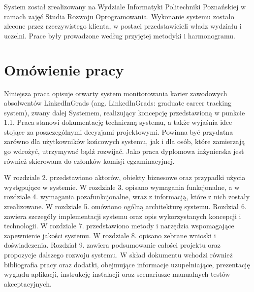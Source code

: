 System został zrealizowany na Wydziale Informatyki Politechniki Poznańskiej w ramach zajęć Studia Rozwoju Oprogramowania. Wykonanie systemu zostało zlecone przez rzeczywistego klienta, w postaci przedstawicieli władz wydziału i uczelni. Prace były prowadzone według przyjętej metodyki i harmonogramu.

\section{Omówienie pracy}
\label{Chapter12}

Niniejsza praca opisuje otwarty system monitorowania karier zawodowych absolwentów LinkedInGrads (ang. LinkedInGrads: graduate career tracking system), zwany dalej Systemem, realizujący koncepcję przedstawioną w punkcie 1.1.  Praca stanowi dokumentację techniczną systemu, a także wyjaśnia idee stojące za poszczególnymi decyzjami projektowymi. Powinna być przydatna zarówno dla użytkowników końcowych systemu, jak i dla osób, które zamierzają go wdrożyć, utrzymywać bądź rozwijać. Jako praca dyplomowa inżynierska jest również skierowana do członków komisji egzaminacyjnej.

W rozdziale 2. przedstawiono aktorów, obiekty biznesowe oraz przypadki użycia występujące w systemie. W rozdziale 3. opisano wymagania funkcjonalne, a w rozdziale 4. wymagania pozafunkcjonalne, wraz z informacją, które z nich zostały zrealizowane. W rozdziale 5. omówiono ogólną architekturę systemu. Rozdział 6. zawiera szczegóły implementacji systemu oraz opis wykorzystanych koncepcji i technologii. W rozdziale 7. przedstawiono metody i narzędzia wspomagające zapewnienie jakości systemu. W rozdziale 8. opisano zebrane wnioski i doświadczenia. Rozdział 9. zawiera podsumowanie całości projektu oraz propozycje dalszego rozwoju systemu. W skład dokumentu wchodzi również bibliografia pracy oraz dodatki, obejmujące informacje uzupełniające, prezentację wyglądu aplikacji, instrukcję instalacji oraz scenariusze manualnych testów akceptacyjnych.